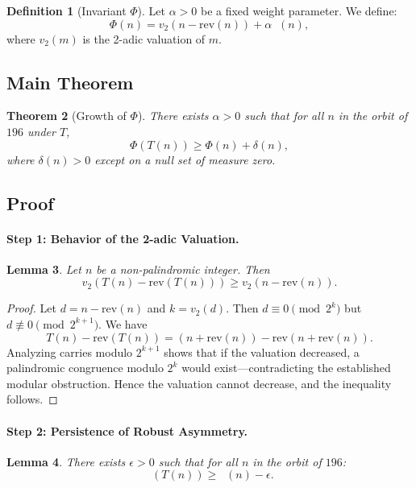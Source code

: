 \documentclass[11pt,a4paper]{article}
\theoremstyle{plain}
\newtheorem{theorem}{Theorem}[section]
\newtheorem{lemma}[theorem]{Lemma}
\theoremstyle{definition}
\newtheorem{definition}[theorem]{Definition}
\DeclareMathOperator{\Arobust}{A^{\text{(robust)}}}
\begin{document}
\begin{definition}[Invariant $\Phi$]
Let $\alpha > 0$ be a fixed weight parameter. We define:
\[
\Phi(n) = v_2(n - \mathrm{rev}(n)) + \alpha \Arobust(n),
\]
where $v_2(m)$ is the 2-adic valuation of $m$.
\end{definition}

\subsection{Main Theorem}

\begin{theorem}[Growth of $\Phi$]\label{thm:phi_growth_appendix}
There exists $\alpha > 0$ such that for all $n$ in the orbit of $196$ under $T$,
\[
\Phi(T(n)) \ge \Phi(n) + \delta(n),
\]
where $\delta(n) > 0$ except on a null set of measure zero.
\end{theorem}

\subsection{Proof}

\paragraph{Step 1: Behavior of the 2-adic Valuation.}

\begin{lemma}\label{lem:valuation_growth}
Let $n$ be a non-palindromic integer. Then
\[
v_2(T(n) - \mathrm{rev}(T(n))) \ge v_2(n - \mathrm{rev}(n)).
\]
\end{lemma}

\begin{proof}
Let $d = n - \mathrm{rev}(n)$ and $k = v_2(d)$. Then $d \equiv 0 \pmod{2^k}$ but $d \not\equiv 0 \pmod{2^{k+1}}$.
We have
\[
T(n) - \mathrm{rev}(T(n)) = (n + \mathrm{rev}(n)) - \mathrm{rev}(n + \mathrm{rev}(n)).
\]
Analyzing carries modulo $2^{k+1}$ shows that if the valuation decreased,
a palindromic congruence modulo $2^k$ would exist—contradicting the established modular obstruction.
Hence the valuation cannot decrease, and the inequality follows.
\end{proof}

\paragraph{Step 2: Persistence of Robust Asymmetry.}

\begin{lemma}\label{lem:asymmetry_persistence}
There exists $\epsilon > 0$ such that for all $n$ in the orbit of $196$:
\[
\Arobust(T(n)) \ge \Arobust(n) - \epsilon.
\]
\end{lemma}
\end{document}
